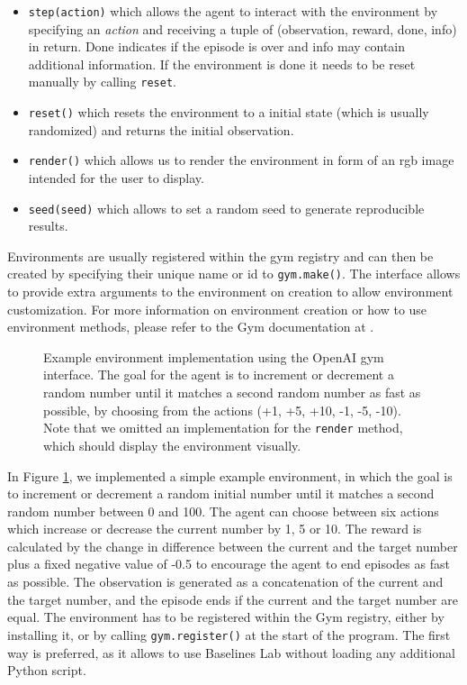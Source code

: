 \begin{itemize}
    \item \texttt{step(action)} which allows the agent to interact with the environment by specifying an \textit{action} and receiving a tuple of (observation, reward, done, info) in return. Done indicates if the episode is over and info may contain additional information. If the environment is done it needs to be reset manually by calling \texttt{reset}.
    \item \texttt{reset()} which resets the environment to a initial state (which is usually randomized) and returns the initial observation.
    \item \texttt{render()} which allows us to render the environment in form of an rgb image intended for the user to display.
    \item \texttt{seed(seed)} which allows to set a random seed to generate reproducible results. 
\end{itemize}

Environments are usually registered within the gym registry and can then be created by specifying their unique name or id to \texttt{gym.make()}. The interface allows to provide extra arguments to the environment on creation to allow environment customization. For more information on environment creation or how to use environment methods, please refer to the Gym documentation at \cite{openAIdocumentation}.

\begin{figure}[p]
    \begin{center}
    \end{center}
    \caption[Example Implementation of a Simple Environment]{Example environment implementation using the OpenAI gym interface. The goal for the agent is to increment or decrement a random number until it matches a second random number as fast as possible, by choosing from the actions (+1, +5, +10, -1, -5, -10). Note that we omitted an implementation for the \texttt{render} method, which should display the environment visually.} \label{fig:EnvironmentExampleImplementation}
\end{figure}

In Figure \ref{fig:EnvironmentExampleImplementation}, we implemented a simple example environment, in which the goal is to increment or decrement a random initial number until it matches a second random number between 0 and 100. The agent can choose between six actions which increase or decrease the current number by 1, 5 or 10. The reward is calculated by the change in difference between the current and the target number plus a fixed negative value of -0.5 to encourage the agent to end episodes as fast as possible. The observation is generated as a concatenation of the current and the target number, and the episode ends if the current and the target number are equal. The environment has to be registered within the Gym registry, either by installing it, or by calling \texttt{gym.register()} at the start of the program. The first way is preferred, as it allows to use Baselines Lab without loading any additional Python script.

